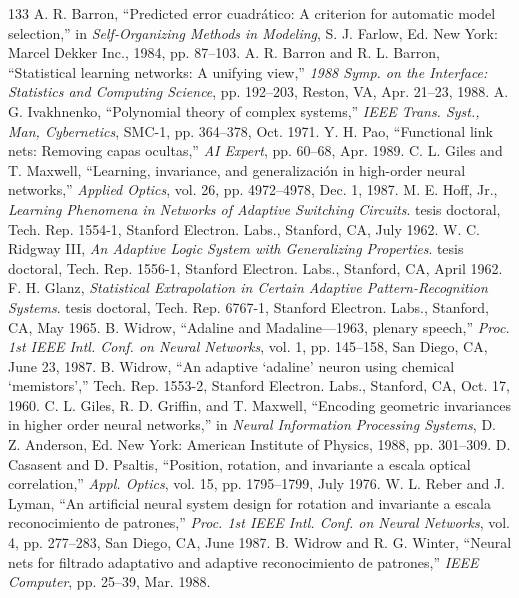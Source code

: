 \documentclass[10pt,twocolumn]{article}
\begin{document}
\begin{thebibliography}{133}
 A. R. Barron, ``Predicted error cuadrático: A criterion for automatic model selection,'' in \textit{Self-Organizing Methods in Modeling}, S. J. Farlow, Ed. New York: Marcel Dekker Inc., 1984, pp. 87--103.
 A. R. Barron and R. L. Barron, ``Statistical learning networks: A unifying view,'' \textit{1988 Symp. on the Interface: Statistics and Computing Science}, pp. 192--203, Reston, VA, Apr. 21--23, 1988.
 A. G. Ivakhnenko, ``Polynomial theory of complex systems,'' \textit{IEEE Trans. Syst., Man, Cybernetics}, SMC-1, pp. 364--378, Oct. 1971.
 Y. H. Pao, ``Functional link nets: Removing capas ocultas,'' \textit{AI Expert}, pp. 60--68, Apr. 1989.
 C. L. Giles and T. Maxwell, ``Learning, invariance, and generalización in high-order neural networks,'' \textit{Applied Optics}, vol. 26, pp. 4972--4978, Dec. 1, 1987.
 M. E. Hoff, Jr., \textit{Learning Phenomena in Networks of Adaptive Switching Circuits}. tesis doctoral, Tech. Rep. 1554-1, Stanford Electron. Labs., Stanford, CA, July 1962.
 W. C. Ridgway III, \textit{An Adaptive Logic System with Generalizing Properties}. tesis doctoral, Tech. Rep. 1556-1, Stanford Electron. Labs., Stanford, CA, April 1962.
 F. H. Glanz, \textit{Statistical Extrapolation in Certain Adaptive Pattern-Recognition Systems}. tesis doctoral, Tech. Rep. 6767-1, Stanford Electron. Labs., Stanford, CA, May 1965.
 B. Widrow, ``Adaline and Madaline---1963, plenary speech,'' \textit{Proc. 1st IEEE Intl. Conf. on Neural Networks}, vol. 1, pp. 145--158, San Diego, CA, June 23, 1987.
 B. Widrow, ``An adaptive `adaline' neuron using chemical `memistors','' Tech. Rep. 1553-2, Stanford Electron. Labs., Stanford, CA, Oct. 17, 1960.
 C. L. Giles, R. D. Griffin, and T. Maxwell, ``Encoding geometric invariances in higher order neural networks,'' in \textit{Neural Information Processing Systems}, D. Z. Anderson, Ed. New York: American Institute of Physics, 1988, pp. 301--309.
 D. Casasent and D. Psaltis, ``Position, rotation, and invariante a escala optical correlation,'' \textit{Appl. Optics}, vol. 15, pp. 1795--1799, July 1976.
 W. L. Reber and J. Lyman, ``An artificial neural system design for rotation and invariante a escala reconocimiento de patrones,'' \textit{Proc. 1st IEEE Intl. Conf. on Neural Networks}, vol. 4, pp. 277--283, San Diego, CA, June 1987.
 B. Widrow and R. G. Winter, ``Neural nets for filtrado adaptativo and adaptive reconocimiento de patrones,'' \textit{IEEE Computer}, pp. 25--39, Mar. 1988.

\end{thebibliography}
\end{document}
